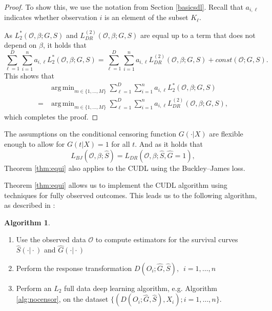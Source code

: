 \documentclass[12pt, a4paper]{scrartcl}
\theoremstyle{definition}
\newtheorem{Algorithm}{Algorithm}[section]
\theoremstyle{plain}
\numberwithin{equation}{section}
\numberwithin{figure}{section}
\numberwithin{table}{section}
\DeclareMathOperator*{\argmin}{arg\,min}
\begin{document}
\begin{proof}
		To show this, we use the notation from Section \ref{basicsdl}.
		Recall that $a_{i,\ell}$ indicates whether observation $i$ is an element of the subset $K_\ell$.
		
		As $L_2^*(\mathcal{O}, \beta; G,S)$ and $L_{DR}^{(2)}(\mathcal{O}, \beta; G,S)$ are equal up to a term that does not depend on $\beta$, it holds that
		\begin{equation*}
		\sum_{\ell=1}^{D} \sum_{i=1}^{n} a_{i,\ell} L_2^*(\mathcal{O}, \beta; G,S) = \sum_{\ell=1}^{D} \sum_{i=1}^{n} a_{i,\ell} L_{DR}^{(2)}(\mathcal{O}, \beta; G,S) + const(\mathcal{O}; G,S).
		\end{equation*}
		This shows that
		\begin{equation*}
		\begin{split}
		 &\argmin_{m \in \{1,\dots, M\}}\sum_{\ell=1}^{D} \sum_{i=1}^{n} a_{i,\ell} L_2^*(\mathcal{O}, \beta; G,S)\\
		  ={} &\argmin_{m \in \{1,\dots, M\}}\sum_{\ell=1}^{D} \sum_{i=1}^{n} a_{i,\ell} L_{DR}^{(2)}(\mathcal{O}, \beta; G,S),
		 \end{split}
		\end{equation*}
		which completes the proof.
	\end{proof}

	The assumptions on the conditional censoring function $G(\cdot\vert X)$ are flexible enough to allow for $G(t\vert X)=1$ for all $t$.
	And as it holds that $$L_{BJ}(\mathcal{O}, \beta; \hat{S})=L_{DR}(\mathcal{O}, \beta; \hat{S}, \hat{G} = 1),$$ Theorem \ref{thm:equi} also applies to the CUDL using the Buckley--James loss.
	
	Theorem \ref{thm:equi} allows us to implement the CUDL algorithm using techniques for fully observed outcomes.
	This leads us to the following algorithm, as described in \citet*{basearticle}:
	\begin{Algorithm}\label{alg:censor}~
		\begin{enumerate}
			\item Use the observed data $\mathcal{O}$ to compute estimators for the survival curves $\hat{S}(\cdot\vert\cdot)$ and $\hat{G}(\cdot\vert\cdot)$
			\item Perform the response transformation $D(O_i; \hat{G},\hat{S}),$~$ i = 1,\dots,n$
			\item Perform an $L_2$ full data deep learning algorithm, e.g. Algorithm \ref{alg:nocensor}, on the dataset $\{(D(O_i; \hat{G},\hat{S}), X_i); i = 1,\dots,n\}$.
		\end{enumerate}
	\end{Algorithm}
\end{document}
